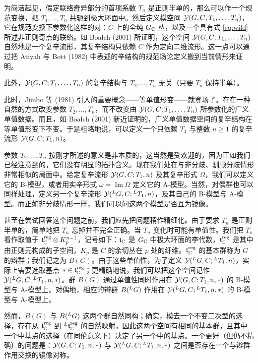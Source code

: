 为简洁起见，假定联络奇异部分的首项系数 $T_{n}$ 是正则半单的，那么可以作一个规范变换，把 $T_{1},\dots,T_{n}$ 共轭到极大环面中。然后定义模空间 $\mathcal{Y}(G,C;T_{1},\dots,T_{n})$，它在规范变换下参数化这样的对：$C$ 上的全纯 $G_{\mathbb{C}}$-丛，以及一个具有式 \eqref{eq:wild} 所述非正则奇点的联络。如 Boalch (2001) 所证明，这个空间 $\mathcal{Y}(G,C;T_{1},\dots,T_{n})$ 自然地是一个复辛流形，其复辛结构只依赖 $C$ 作为定向二维流形。这一点可以通过把 Atiyah 与 Bott (1982) 中表述的辛结构的规范场论定义搬到当前情形来证明。

此外，$\mathcal{Y}(G,C;T_{1},\dots,T_{n})$ 的复辛结构与 $T_{2},\dots,T_{n}$ 无关（只要 $T_{n}$ 保持半单）。

此时，Jimbo 等 (1981) 引入的重要概念——等单值形变——就登场了。存在一种自然的方式改变参数 $T_{2},\dots,T_{n}$，而不改变由 $\mathcal{Y}(G,C;T_{1},\dots,T_{n})$ 所参数化的广义单值数据。而且，如 Boalch (2001) 新近证明的，广义单值数据空间的复辛结构在等单值形变下不变。于是粗略地说，可以定义一个只依赖 $T_{1}$ 与整数 $n\ge1$ 的复辛流形 $\mathcal{Y}(G,C;T_{1},n)$。

参数 $T_{2},\dots,T_{n}$ 按刚才所述的意义是非本质的，这当然是受欢迎的，因为正如我们已经注意到的，它们没有明显的拓扑含义。现在我们处在与非分歧、驯顺分歧情形非常相似的局面中。给定复辛流形 $\mathcal{Y}(G,C;T_{1},n)$ 及其复辛形式 $\Omega$，我们可以定义它的 B-模型，或者用实辛形式 $\omega=\operatorname{Im}\Omega$ 定义它的 A-模型。当然，对偶群也可以同样处理，定义另一个复辛流形 $\mathcal{Y}({}^{L}G,C;{}^{L}T_{1},n)$，及其自己的 B-模型与 A-模型。而正如非分歧情形一样，我们可以问这两个模型是否互为镜像。

甚至在尝试回答这个问题之前，我们应先把问题稍作精细化。由于要求 $T_{n}$ 是正则半单的，简单地把 $T_{n}$ 忘掉并不完全正确。当 $T_{n}$ 变化时可能有单值性。我们把 $T_{n}$ 看作取值于 $\mathfrak{t}_{\mathbb{C}}^{\mathrm{reg}}\otimes K_{p}^{n-1}$，记号如下：$\mathfrak{t}_{\mathbb{C}}$ 是 $G_{\mathbb{C}}$ 中极大环面的李代数，$\mathfrak{t}_{\mathbb{C}}^{\mathrm{reg}}$ 是其中由正则元构成的子空间，$K_{p}$ 是 $C$ 的余切丛在 $p$ 处的纤维。$\mathfrak{t}_{\mathbb{C}}^{\mathrm{reg}}$ 的基本群称为 $G$ 的辫群；我们记之为 $B(G)$。由于这些单值性，为了定义 $\mathcal{Y}({}^{L}G,C;{}^{L}T_{1},n)$，实际上需要选取基点 $*\in\mathfrak{t}_{\mathbb{C}}^{\mathrm{reg}}$；更精确地说，我们可以把这个空间记作 $\mathcal{Y}({}^{L}G,C;{}^{L}T_{1},n,*)$。群 $B(G)$ 通过单值性同时作用在 $\mathcal{Y}(G,C;T_{1},n,*)$ 的 B-模型与 A-模型上。对偶地，相应的辫群 $B({}^{L}G)$ 作用在 $\mathcal{Y}({}^{L}G,C;{}^{L}T_{1},n,*)$ 的 B-模型与 A-模型上。

然而，$B(G)$ 与 $B({}^{L}G)$ 这两个群自然同构；确实，模去一个不变二次型的选择，存在从 $\mathfrak{t}_{\mathbb{C}}^{\mathrm{reg}}$ 到 ${}^{L}\mathfrak{t}_{\mathbb{C}}^{\mathrm{reg}}$ 的自然映射，因此这两个空间有相同的基本群，且其中一个中基点的选择（在同伦意义下）决定了另一个中的基点。一个更好（但仍不精确）的问题是：$\mathcal{Y}(G,C;T_{1},n,*)$ 与 $\mathcal{Y}({}^{L}G,C;{}^{L}T_{1},n,*)$ 之间是否存在一个与辫群作用交换的镜像对称。

